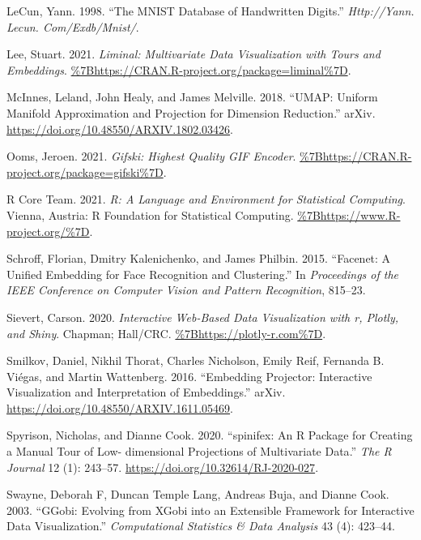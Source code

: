 \begin{CSLReferences}{1}{0}
\leavevmode{}%
LeCun, Yann. 1998. {``The MNIST Database of Handwritten Digits.''} \emph{Http://Yann. Lecun. Com/Exdb/Mnist/}.

\leavevmode{}%
Lee, Stuart. 2021. \emph{Liminal: Multivariate Data Visualization with Tours and Embeddings}. \url{\%7Bhttps://CRAN.R-project.org/package=liminal\%7D}.

\leavevmode{}%
McInnes, Leland, John Healy, and James Melville. 2018. {``UMAP: Uniform Manifold Approximation and Projection for Dimension Reduction.''} arXiv. \url{https://doi.org/10.48550/ARXIV.1802.03426}.

\leavevmode{}%
Ooms, Jeroen. 2021. \emph{Gifski: Highest Quality GIF Encoder}. \url{\%7Bhttps://CRAN.R-project.org/package=gifski\%7D}.

\leavevmode{}%
R Core Team. 2021. \emph{R: A Language and Environment for Statistical Computing}. Vienna, Austria: R Foundation for Statistical Computing. \url{\%7Bhttps://www.R-project.org/\%7D}.

\leavevmode{}%
Schroff, Florian, Dmitry Kalenichenko, and James Philbin. 2015. {``Facenet: A Unified Embedding for Face Recognition and Clustering.''} In \emph{Proceedings of the IEEE Conference on Computer Vision and Pattern Recognition}, 815--23.

\leavevmode{}%
Sievert, Carson. 2020. \emph{Interactive Web-Based Data Visualization with r, Plotly, and Shiny}. Chapman; Hall/CRC. \url{\%7Bhttps://plotly-r.com\%7D}.

\leavevmode{}%
Smilkov, Daniel, Nikhil Thorat, Charles Nicholson, Emily Reif, Fernanda B. Viégas, and Martin Wattenberg. 2016. {``Embedding Projector: Interactive Visualization and Interpretation of Embeddings.''} arXiv. \url{https://doi.org/10.48550/ARXIV.1611.05469}.

\leavevmode{}%
Spyrison, Nicholas, and Dianne Cook. 2020. {``{spinifex: An R Package for Creating a Manual Tour of Low- dimensional Projections of Multivariate Data}.''} \emph{{The R Journal}} 12 (1): 243--57. \url{https://doi.org/10.32614/RJ-2020-027}.

\leavevmode{}%
Swayne, Deborah F, Duncan Temple Lang, Andreas Buja, and Dianne Cook. 2003. {``GGobi: Evolving from XGobi into an Extensible Framework for Interactive Data Visualization.''} \emph{Computational Statistics \& Data Analysis} 43 (4): 423--44.


\end{CSLReferences}
